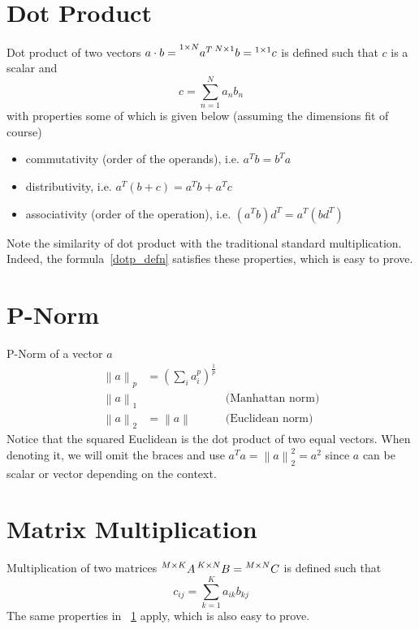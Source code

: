 \documentclass{book}
\newcommand{\norm}[2][]{\left\lVert#2\right\rVert_{#1}}
\numberwithin{equation}{subsection}
\begin{document}
\section{Dot Product}
\label{dotp}
Dot product of two vectors $a\cdot b=\prescript{1\times N}{}{a^T}\prescript{N\times 1}{}{b}=\prescript{1 \times 1}{}{c}$ is defined such that $c$ is a scalar and
\begin{equation}
    c = \sum_{n=1}^N a_nb_n \label{dotp_defn}
\end{equation}
with properties some of which is given below (assuming the dimensions fit of course)
\begin{itemize}
    \item commutativity (order of the operands), i.e. $a^Tb = b^Ta$
    \item distributivity, i.e. $a^T(b+c) = a^Tb+a^Tc$
    \item associativity (order of the operation), i.e. $(a^Tb)d^T = a^T(bd^T)$
\end{itemize}
Note the similarity of dot product with the traditional standard multiplication. Indeed, the formula~\ref{dotp_defn} satisfies these properties, which is easy to prove.
\section{P-Norm}
P-Norm of a vector $a$
\begin{align}
    \norm[p]{a} &= (\sum_i a_i^p)^{\frac{1}{p}} &\\
    \norm[1]{a} & & \text{(Manhattan norm)} \label{man_norm}\\
    \norm[2]{a} &= \norm[]{a} & \text{(Euclidean norm)} \label{euc_norm}
\end{align}
Notice that the squared Euclidean is the dot product of two equal vectors. When denoting it, we will omit the braces and use $a^Ta = \norm[2]{a}^2 = a^2$ since $a$ can be scalar or vector depending on the context.
\section{Matrix Multiplication}
Multiplication of two matrices
$\prescript{M\times K}{}{A}\prescript{K\times N}{}{B}=\prescript{M\times N}{}{C}$ is defined such that
\begin{equation}
    c_{ij} = \sum_{k=1}^K a_{ik}b_{kj}
    \label{matmult}
\end{equation}
The same properties in ~\ref{dotp} apply, which is also easy to prove.
\end{document}
